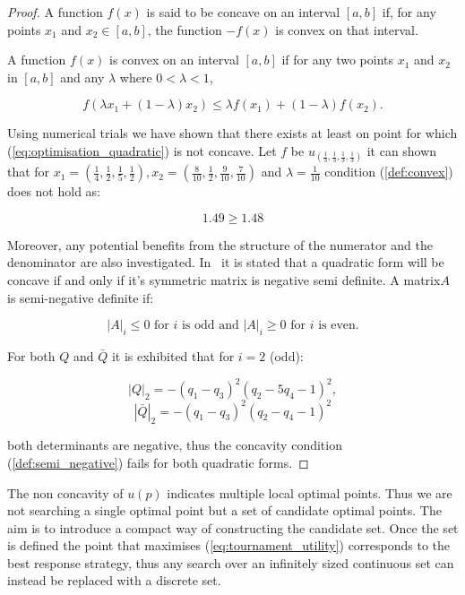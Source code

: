 \documentclass[10pt]{article}
\begin{document}
\begin{proof}
    A function \(f(x)\) is said to be concave on an interval \([a, b]\) if, for any
    points \(x_1\) and \(x_2 \in [a, b]\), the function \(-f(x)\) is convex on that
    interval.

    A function \(f(x)\) is convex on an interval \([a, b]\) if for any two
    points \(x_1\) and \(x_2\) in \([a, b]\) and any \(\lambda\) where \(0 < \lambda < 1\),

    \begin{equation}\label{def:convex}
    f (\lambda x_1 + (1 - \lambda )x_2 ) \leq \lambda f (x_1 ) + (1 - \lambda )f (x_2 ).
    \end{equation}

    Using numerical trials we have shown that there exists at least on point for which
    (\ref{eq:optimisation_quadratic}) is not concave. Let \(f\) be
    \(u_{(\frac{1}{3}, \frac{1}{3}, \frac{1}{3}, \frac{1}{3})}\) it can shown that
    for \(x_1 = (\frac{1}{4}, \frac{1}{2}, \frac{1}{5} , \frac{1}{2}),
    x_2 = (\frac{8}{10}, \frac{1}{2}, \frac{9}{10} , \frac{7}{10})\) and \(\lambda=\frac{1}{10}\)
    condition (\ref{def:convex}) does not hold as:

    \[1.49 \geq 1.48\]

    Moreover, any potential benefits from the structure of the numerator and the denominator
    are also investigated. In~\cite{Anton2014} it is stated that a quadratic form will
    be concave if and only if it's symmetric matrix is negative semi definite.
    A matrix\(A\) is semi-negative definite if:

    \begin{equation}\label{def:semi_negative}
    |A|_i \leq 0 \text{ for } i \text{ is odd and } |A|_i \geq 0  \text{ for } i
    \text{ is even.}
    \end{equation}

    For both \(Q\) and \(\bar{Q}\) it is exhibited that for \(i=2\) (odd):

    \[|Q|_2 = - \left(q_{1} - q_{3}\right)^{2} \left(q_{2} - 5 q_{4} - 1\right)^{2},\]
    \[|\bar{Q}|_2 =- \left(q_{1} - q_{3}\right)^{2} \left(q_{2} - q_{4} - 1\right)^{2}\]

    both determinants are negative, thus the concavity condition (\ref{def:semi_negative})
    fails for both quadratic forms.
\end{proof}

The non concavity of \(u(p)\) indicates multiple local optimal points. Thus we
are not searching a single optimal point but a set of candidate optimal points.
The aim is to introduce a compact way of constructing the candidate set. Once
the set is defined the point that maximises (\ref{eq:tournament_utility}) corresponds to the best
response strategy, thus any search over an infinitely sized continuous set can instead
be replaced with a discrete set.
\end{document}
